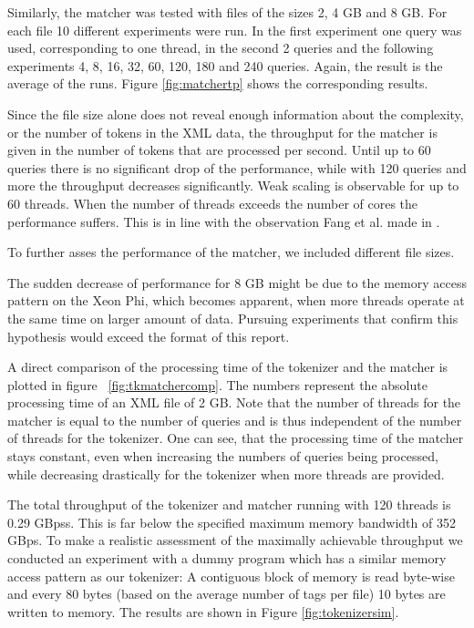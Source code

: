 Similarly, the matcher was tested with files of the sizes 2, 4 GB and 8 GB. For
each file 10 different experiments were run. In the first experiment one query
was used, corresponding to one thread, in the second 2 queries and the following
experiments 4, 8, 16, 32, 60, 120, 180 and 240 queries.  Again, the result is
the average of the runs. Figure \ref{fig:matchertp} shows the corresponding
results.

Since the file size alone does not reveal enough information about the
complexity, or the number of tokens in the XML data, the throughput for the
matcher is given in the number of tokens that are processed per second. Until up
to 60 queries there is no significant drop of the performance, while with 120
queries and more the throughput decreases significantly. Weak scaling is
observable for up to 60 threads. When the number of threads exceeds the number
of cores the performance suffers. This is in line with the observation Fang et
al. made in \cite{Fang14}.


To further asses the performance of the matcher, we included different file
sizes.

The sudden decrease of performance for 8 GB might be
due to the memory access pattern on the Xeon Phi, which becomes apparent, when
more threads operate at the same time on larger amount of data.  Pursuing
experiments that confirm this hypothesis would exceed the format of this report. 

A direct comparison of the processing time of the tokenizer and the matcher is
plotted in figure ~\ref{fig:tkmatchercomp}. The numbers represent the absolute
processing time of an XML file of 2 GB. Note that the number of threads for the
matcher is equal to the number of queries and is thus independent of the number
of threads for the tokenizer. One can see, that the processing time of the
matcher stays constant, even when increasing the numbers of queries being
processed, while decreasing drastically for the tokenizer when more threads are
provided.

The total throughput of the tokenizer and matcher running with 120 threads is
0.29 GBpss. This is far below the specified maximum memory bandwidth of 352
GBps. To make a realistic assessment of the maximally achievable throughput
we conducted an experiment with a dummy program which has a similar memory
access pattern as our tokenizer: A contiguous block of memory is read byte-wise
and every 80 bytes (based on the average number of tags per file) 10 bytes are
written to memory. The results are shown in Figure \ref{fig:tokenizersim}.
